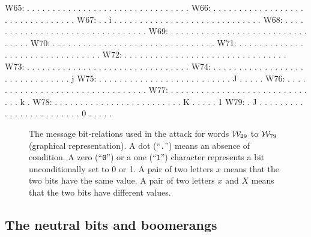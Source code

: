 \begin{verbbox}
W65:	 . . . . . . . . . . . . . . . . . . . . . . . . . . . . . . . .
W66:	 . . . . . . . . . . . . . . . . . . . . . . . . . . . . . . . .
W67:	 . . i . . . . . . . . . . . . . . . . . . . . . . . . . . . . .
W68:	 . . . . . . . . . . . . . . . . . . . . . . . . . . . . . . . .
W69:	 . . . . . . . . . . . . . . . . . . . . . . . . . . . . . . . .
W70:	 . . . . . . . . . . . . . . . . . . . . . . . . . . . . . . . .
W71:	 . . . . . . . . . . . . . . . . . . . . . . . . . . . . . . . .
W72:	 . . . . . . . . . . . . . . . . . . . . . . . . . . . . . . . .
W73:	 . . . . . . . . . . . . . . . . . . . . . . . . . . . . . . . .
W74:	 . . . . . . . . . . . . . . . . . . . . . . . . . . . . . . . j
W75:	 . . . . . . . . . . . . . . . . . . . . . . . . . . J . . . . .
W76:	 . . . . . . . . . . . . . . . . . . . . . . . . . . . . . . . .
W77:	 . . . . . . . . . . . . . . . . . . . . . . . . . . . . . . k .
W78:	 . . . . . . . . . . . . . . . . . . . . . . . . . K . . . . . 1
W79:	 . J . . . . . . . . . . . . . . . . . . . . . . . . 0 . . . . .
\end{verbbox}
\endgroup

\begin{figure}[!htb]
\centering
  \theverbbox
  \caption{The message bit-relations used in the attack for words $\mathcal{W}_{29}$ to $\mathcal{W}_{79}$ (graphical representation).
  A dot (``\texttt{.}'') means an absence of condition. A zero (``\texttt{0}'') or a one (``\texttt{1}'') character represents a bit unconditionally set to 0 or 1.
  A pair of two letters $x$ means that the two bits have the same value. A pair of two
  letters $x$ and $X$ means that the two bits have different values.
  \label{fig:msgbitrel80_graph}}
\end{figure}

\subsection{The neutral bits and boomerangs}
\label{sec:neutral_bits80}

